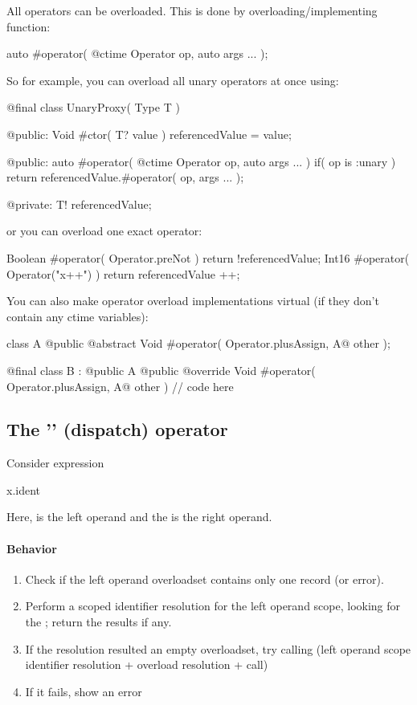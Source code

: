 All operators can be overloaded. This is done by overloading/implementing function:
\begin{code}
auto #operator( @ctime Operator op, auto args ... );
\end{code}

So for example, you can overload all unary operators at once using:
\begin{code}
@final class UnaryProxy( Type T ) {
	
@public:
	Void #ctor( T? value ) {
		referencedValue = value;
	}
	
@public:
	auto #operator( @ctime Operator op, auto args ... )
		if( op is :unary )
	{
		return referencedValue.#operator( op, args ... );
	}
	
@private:
	T! referencedValue;
	
}
\end{code}

or you can overload one exact operator:
\begin{code}
Boolean #operator( Operator.preNot ) {
	return !referencedValue;	
}
Int16 #operator( Operator("x++") ) {
	return referencedValue ++;
}
\end{code}

You can also make operator overload implementations virtual (if they don't contain any ctime variables):
\begin{code}
class A {
	@public @abstract Void #operator( Operator.plusAssign, A@ other );
}

@final class B : @public A {
	@public @override Void #operator( Operator.plusAssign, A@ other ) {
		// code here	
	}
}
\end{code}

\subsection{The '' (dispatch) operator}
Consider expression
\begin{code}
x.ident
\end{code}

Here,  is the left operand and the  is the right operand.

\paragraph{Behavior}
\begin{enumerate}
	\item Check if the left operand overloadset contains only one record (or error).
	\item Perform a scoped identifier resolution for the left operand scope, looking for the ; return the results if any.
	\item If the resolution resulted an empty overloadset, try calling (left operand scope identifier resolution + overload resolution + call)\\ 
	\item If it fails, show an error
\end{enumerate}

